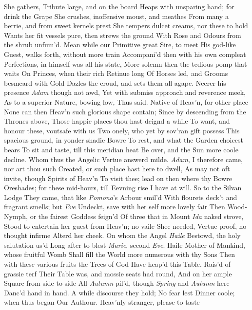 \documentclass[11pt]{book}
\begin{document}
She gathers, Tribute large, and on the board 
Heaps with unsparing hand; for drink the Grape 
She crushes, inoffensive moust, and meathes 
From many a berrie, and from sweet kernels prest 
She tempers dulcet creams, nor these to hold 
Wants her fit vessels pure, then strews the ground 
With Rose and Odours from the shrub unfum'd. 
Mean while our Primitive great Sire, to meet 
His god-like Guest, walks forth, without more train 
Accompani'd then with his own compleat 
Perfections, in himself was all his state, 
More solemn then the tedious pomp that waits 
On Princes, when their rich Retinue long 
Of Horses led, and Grooms besmeard with Gold 
Dazles the croud, and sets them all agape. 
Neerer his presence \textit{Adam} though not awd, 
Yet with submiss approach and reverence meek, 
As to a superior Nature, bowing low, 
\quad Thus said.  Native of Heav'n, for other place 
None can then Heav'n such glorious shape contain; 
Since by descending from the Thrones above, 
Those happie places thou hast deignd a while 
To want, and honour these, voutsafe with us 
Two onely, who yet by sov'ran gift possess 
This spacious ground, in yonder shadie Bowre 
To rest, and what the Garden choicest bears 
To sit and taste, till this meridian heat 
Be over, and the Sun more coole decline. 
\quad Whom thus the Angelic Vertue answerd milde. 
\textit{Adam}, I therefore came, nor art thou such 
Created, or such place hast here to dwell, 
As may not oft invite, though Spirits of Heav'n 
To visit thee; lead on then where thy Bowre 
Oreshades; for these mid-hours, till Eevning rise 
I have at will.  So to the Silvan Lodge 
They came, that like \textit{Pomona}'s Arbour smil'd 
With flourets deck't and fragrant smells; but \textit{Eve} 
Undeckt, save with her self more lovely fair 
Then Wood-Nymph, or the fairest Goddess feign'd 
Of three that in Mount \textit{Ida} naked strove, 
Stood to entertain her guest from Heav'n; no vaile 
Shee needed, Vertue-proof, no thought infirme 
Alterd her cheek.  On whom the Angel \textit{Haile} 
Bestowd, the holy salutation us'd 
Long after to blest \textit{Marie}, second \textit{Eve}. 
\quad Haile Mother of Mankind, whose fruitful Womb 
Shall fill the World more numerous with thy Sons 
Then with these various fruits the Trees of God 
Have heap'd this Table.  Rais'd of grassie terf 
Their Table was, and mossie seats had round, 
And on her ample Square from side to side 
All \textit{Autumn} pil'd, though \textit{Spring} and \textit{Autumn} here 
Danc'd hand in hand.  A while discourse they hold; 
No fear lest Dinner coole; when thus began 
Our Authour.  Heav'nly stranger, please to taste 
\end{document}
